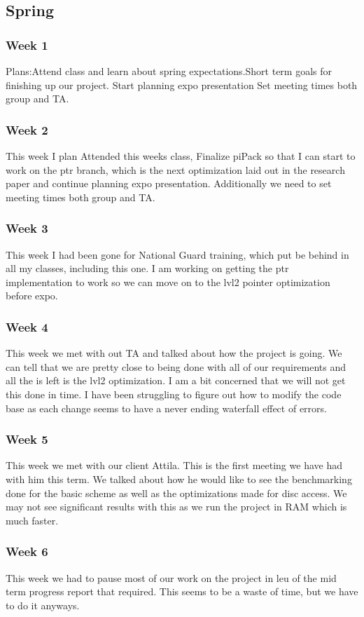 \subsection{Spring}
\subsubsection{Week 1}
Plans:Attend class and learn about spring expectations.Short term goals for finishing up our project. Start planning expo presentation
Set meeting times both group and TA.
\subsubsection{Week 2}
This week I plan Attended this weeks class, Finalize piPack so that I can start to work on the ptr branch, which is the next optimization laid out in the research paper and continue planning expo presentation. Additionally we need to set meeting times both group and TA.
\subsubsection{Week 3}
This week I had been gone for National Guard training, which put be behind in all my classes, including this one. I am working on getting the ptr implementation to work so we can move on to the lvl2 pointer optimization before expo.
\subsubsection{Week 4}
This week we met with out TA and talked about how the project is going. We can tell that we are pretty close to being done with all of our requirements and all the is left is the lvl2 optimization. I am a bit concerned that we will not get this done in time. I have been struggling to figure out how to modify the code base as each change seems to have a never ending waterfall effect of errors.
\subsubsection{Week 5}
This week we met with our client Attila. This is the first meeting we have had with him this term. We talked about how he would like to see the benchmarking done for the basic scheme as well as the optimizations made for disc access. We may not see significant results with this as we run the project in RAM which is much faster.
\subsubsection{Week 6}
This week we had to pause most of our work on the project in leu of the mid term progress report that required. This seems to be a waste of time, but we have to do it anyways.
